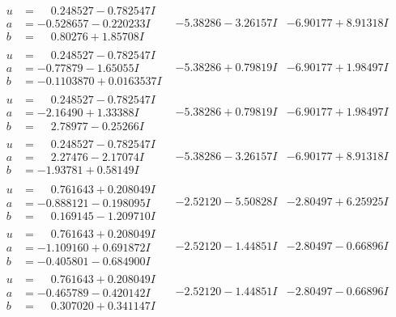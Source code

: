 \documentclass[1p]{elsarticle_modified}
\theoremstyle{definition}
\begin{document}
$$\begin{array}{c|c|c}
\begin{aligned}
u &= \phantom{-}0.248527 - 0.782547 I \\
a &= -0.528657 - 0.220233 I \\
b &= \phantom{-}0.80276 + 1.85708 I\end{aligned}
 & -5.38286 - 3.26157 I & -6.90177 + 8.91318 I \\ \hline\begin{aligned}
u &= \phantom{-}0.248527 - 0.782547 I \\
a &= -0.77879 - 1.65055 I \\
b &= -0.1103870 + 0.0163537 I\end{aligned}
 & -5.38286 + 0.79819 I & -6.90177 + 1.98497 I \\ \hline\begin{aligned}
u &= \phantom{-}0.248527 - 0.782547 I \\
a &= -2.16490 + 1.33388 I \\
b &= \phantom{-}2.78977 - 0.25266 I\end{aligned}
 & -5.38286 + 0.79819 I & -6.90177 + 1.98497 I \\ \hline\begin{aligned}
u &= \phantom{-}0.248527 - 0.782547 I \\
a &= \phantom{-}2.27476 - 2.17074 I \\
b &= -1.93781 + 0.58149 I\end{aligned}
 & -5.38286 - 3.26157 I & -6.90177 + 8.91318 I \\ \hline\begin{aligned}
u &= \phantom{-}0.761643 + 0.208049 I \\
a &= -0.888121 - 0.198095 I \\
b &= \phantom{-}0.169145 - 1.209710 I\end{aligned}
 & -2.52120 - 5.50828 I & -2.80497 + 6.25925 I \\ \hline\begin{aligned}
u &= \phantom{-}0.761643 + 0.208049 I \\
a &= -1.109160 + 0.691872 I \\
b &= -0.405801 - 0.684900 I\end{aligned}
 & -2.52120 - 1.44851 I & -2.80497 - 0.66896 I \\ \hline\begin{aligned}
u &= \phantom{-}0.761643 + 0.208049 I \\
a &= -0.465789 - 0.420142 I \\
b &= \phantom{-}0.307020 + 0.341147 I\end{aligned}
 & -2.52120 - 1.44851 I & -2.80497 - 0.66896 I \\ \hline\begin{aligned}

\end{aligned}
\end{array}$$
\end{document}
